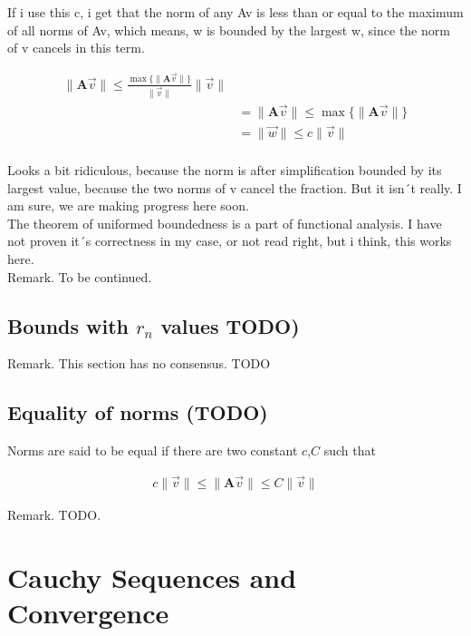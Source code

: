 \documentclass[a4paper]{article}
\begin{document}
\begin{Example}
If i use this c, i get that the norm of any Av is less than or equal to the maximum of all norms of Av, which means, w is bounded by the largest w, since the norm of v cancels in this term.

\begin{displaymath}
\begin{align}
\|\boldsymbol{A}\vec{v}\| \leq \frac{\max\{\|\boldsymbol{A}\vec{v}\|\}}{\|\vec{v}\|}\|\vec{v}\| \\
&= \|\boldsymbol{A}\vec{v}\| \leq \max\{\|\boldsymbol{A}\vec{v}\|\}\\
&= \|\vec{w}\| \leq c\|\vec{v}\| \\
\end{align}
\end{displaymath}

Looks a bit ridiculous, because the norm is after simplification bounded by its largest value, because the two norms of v cancel the fraction. But it isn´t really. I am sure, we are making progress here soon.\\

The theorem of uniformed boundedness is a part of functional analysis. I have not proven it´s correctness in my case, or not read right, but i think, this works here.\\

Remark. To be continued.\\

\subsection{Bounds with $r_n$ values TODO)}

Remark. This section has no consensus. TODO

\subsection{Equality of norms (TODO)}

Norms are said to be equal if there are two constant $c$,$C$ such that

\begin{displaymath}
\begin{align}
    c\|\vec{v}\| \leq \|\boldsymbol{A}\vec{v}\| \leq C\|\vec{v}\|
\end{align}
\end{displaymath}

Remark. TODO.

\section{Cauchy Sequences and Convergence}

\end{Example}
\end{document}
